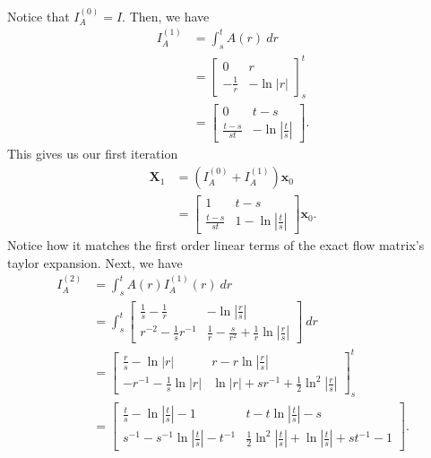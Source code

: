 \documentclass[12pt]{article}
\begin{document}
Notice that $I_A^{(0)} = I$. Then, we have
\begin{align*}
    I_A^{(1)} & = \int_s^t A(r) ~ dr                     \\
              & =  \begin{bmatrix}
                       0            & r       \\
                       -\frac{1}{r} & -\ln|r|
                   \end{bmatrix}^t_s            \\
              & = \begin{bmatrix}
                      0              & t-s               \\
                      \frac{t-s}{st} & -\ln|\frac{t}{s}|
                  \end{bmatrix}.
\end{align*}
This gives us our first iteration
\begin{align*}
    \mathbf{X}_1 & = (I_A^{(0)} + I_A^{(1)})\mathbf{x}_0     \\
                 & = \begin{bmatrix}
                         1              & t-s                \\
                         \frac{t-s}{st} & 1-\ln|\frac{t}{s}|
                     \end{bmatrix}\mathbf{x}_0.
\end{align*}
Notice how it matches the first order linear terms of the exact flow matrix's taylor expansion.
Next, we have
\begin{align*}
    I_A^{(2)} & = \int_s^t A(r) I_A^{(1)}(r) ~ dr                                                                               \\
              & = \int_s^t \begin{bmatrix}
                               \frac{1}{s} - \frac{1}{r} & -\ln|\frac{r}{s}|                                       \\
                               r^{-2}-\frac{1}{s}r^{-1}  & \frac{1}{r}-\frac{s}{r^2} + \frac{1}{r}\ln|\frac{r}{s}|
                           \end{bmatrix} ~ dr              \\
              & = \begin{bmatrix}
                      \frac{r}{s} - \ln|r|       & r - r \ln|\frac{r}{s}|                           \\
                      -r^{-1} -\frac{1}{s}\ln|r| & \ln|r| + sr^{-1} + \frac{1}{2}\ln^2|\frac{r}{s}|
                  \end{bmatrix}^t_s                             \\
              & = \begin{bmatrix}
                      \frac{t}{s} - \ln|\frac{t}{s}| - 1       & t - t\ln|\frac{t}{s}| -s                                       \\
                      s^{-1} - s^{-1}\ln|\frac{t}{s}| - t^{-1} & \frac{1}{2}\ln^2|\frac{t}{s}| + \ln|\frac{t}{s}| + st^{-1} - 1
                  \end{bmatrix}.
\end{align*}
\end{document}
